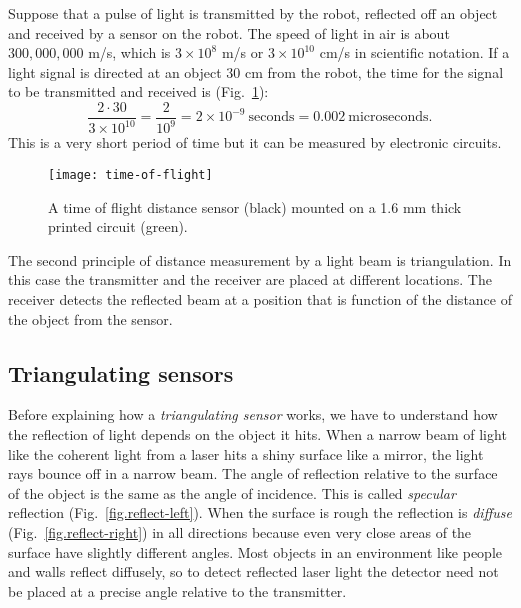 Suppose that a pulse of light is transmitted by the robot, reflected off an object and received by a sensor on the robot. The speed of light in air is about $300,000,000$ m/s, which is $3\times 10^8$ m/s or $3\times 10^{10}$ cm/s in scientific notation. If a light signal is directed at an object $30$ cm from the robot, the time for the signal to be transmitted and received is (Fig.~\ref{fig.ir}):
\[\frac{2\cdot 30}{3\times 10^{10}} = \frac{2}{10^9} = 2\times 10^{-9}\  \textrm{seconds} = 0.002\  \textrm{microseconds}.\]
This is a very short period of time but it can be measured by electronic circuits.

\begin{figure}
\sidecaption
\texttt{[image: time-of-flight]}
\caption{A time of flight distance sensor (black) mounted on a 1.6 mm thick printed circuit (green).}\label{fig.ir}
\end{figure}

The second principle of distance measurement by a light beam is triangulation. In this case the transmitter and the receiver are placed at different locations. The receiver detects the reflected beam at a position that is function of the distance of the object from the sensor.

\subsection{Triangulating sensors}\label{s.triangulating-sensors}

Before explaining how a \emph{triangulating sensor} works, we have to understand how the reflection of light depends on the object it hits. When a narrow beam of light like the coherent light from a laser hits a shiny surface like a mirror, the light rays bounce off in a narrow beam. The angle of reflection relative to the surface of the object is the same as the angle of incidence. This is called \emph{specular} reflection (Fig.~\ref{fig.reflect-left}). When the surface is rough the reflection is \emph{diffuse} (Fig.~\ref{fig.reflect-right}) in all directions because even very close areas of the surface have slightly different angles. Most objects in an environment like people and walls reflect diffusely, so to detect reflected laser light the detector need not be placed at a precise angle relative to the transmitter.

